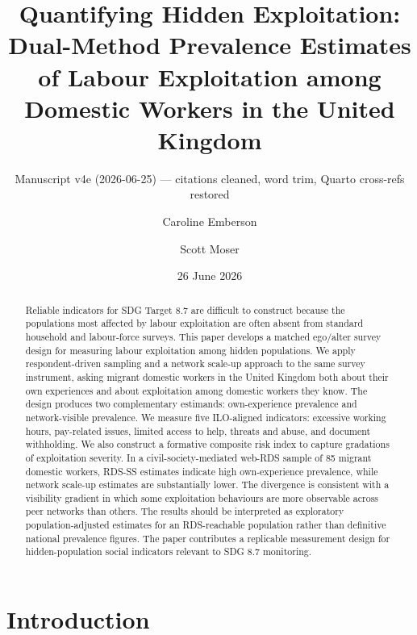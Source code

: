 \documentclass[
  12pt,
  letterpaper,
  DIV=11,
  numbers=noendperiod]{scrartcl}
\title{Quantifying Hidden Exploitation: Dual-Method Prevalence Estimates
of Labour Exploitation among Domestic Workers in the United Kingdom}
\subtitle{Manuscript v4e (2026-06-25) --- citations cleaned, word trim,
Quarto cross-refs restored}
\author{Caroline Emberson \and Scott Moser}
\date{26 June 2026}
\begin{document}
\maketitle
\begin{abstract}
Reliable indicators for SDG Target 8.7 are difficult to construct
because the populations most affected by labour exploitation are often
absent from standard household and labour-force surveys. This paper
develops a matched ego/alter survey design for measuring labour
exploitation among hidden populations. We apply respondent-driven
sampling and a network scale-up approach to the same survey instrument,
asking migrant domestic workers in the United Kingdom both about their
own experiences and about exploitation among domestic workers they know.
The design produces two complementary estimands: own-experience
prevalence and network-visible prevalence. We measure five ILO-aligned
indicators: excessive working hours, pay-related issues, limited access
to help, threats and abuse, and document withholding. We also construct
a formative composite risk index to capture gradations of exploitation
severity. In a civil-society-mediated web-RDS sample of 85 migrant
domestic workers, RDS-SS estimates indicate high own-experience
prevalence, while network scale-up estimates are substantially lower.
The divergence is consistent with a visibility gradient in which some
exploitation behaviours are more observable across peer networks than
others. The results should be interpreted as exploratory
population-adjusted estimates for an RDS-reachable population rather
than definitive national prevalence figures. The paper contributes a
replicable measurement design for hidden-population social indicators
relevant to SDG 8.7 monitoring.
\end{abstract}


\section{Introduction}\label{sec-intro}
\end{document}
